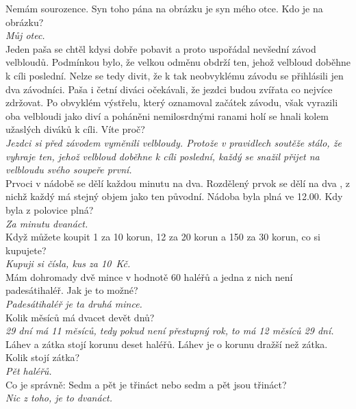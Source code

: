 \begin{multicols}{2}
\noindent
Nemám sourozence. Syn toho pána na obrázku je syn mého otce.
Kdo je na obrázku?\\[1 mm]
{\sl Můj otec.}\\

\noindent
Jeden paša se chtěl kdysi dobře pobavit a proto uspořádal 
nevšední závod velbloudů. Podmínkou bylo, že velkou odměnu obdrží 
ten, jehož velbloud doběhne k cíli poslední. Nelze se tedy divit, 
že k tak neobvyklému závodu se přihlásili jen dva závodníci. 
Paša i četní diváci očekávali, že jezdci budou zvířata co nejvíce 
zdržovat. Po obvyklém výstřelu, který oznamoval začátek závodu, však
vyrazili oba velbloudi jako diví a poháněni nemilosrdnými ranami holí 
se hnali kolem užaslých diváků k cíli. Víte proč?\\[1 mm]
{\sl Jezdci si před závodem vyměnili velbloudy. Protože v pravidlech
soutěže stálo, že vyhraje ten, jehož velbloud doběhne k cíli
poslední, každý se snažil přijet na velbloudu svého soupeře první.}\\

\noindent
Prvoci v nádobě se dělí každou minutu na dva. Rozdělený
prvok se dělí na dva , z nichž každý má stejný objem jako ten
původní. Nádoba byla plná ve 12.00. Kdy byla z polovice plná?\\[1 mm]
{\sl Za minutu dvanáct.}\\

\noindent
Když můžete koupit 1 za 10 korun, 12 za 20 korun a 150 za
30 korun, co si kupujete?\\[1 mm]
{\sl Kupuji si čísla, kus za 10~Kč.}\\

\noindent
Mám dohromady dvě mince v hodnotě 60 haléřů a jedna z nich 
není padesátihaléř. Jak je to možné?\\[1 mm]
{\sl Padesátihaléř je ta druhá mince.}\\

\noindent
Kolik měsíců má dvacet devět dnů?\\[1 mm]
{\sl 29 dní má 11 měsíců, tedy pokud není přestupný rok, to má
12 měsíců 29 dní.}\\

\noindent
Láhev a zátka stojí korunu deset haléřů. Láhev je o korunu 
dražší než zátka. Kolik stojí zátka?\\[1 mm]
{\sl Pět haléřů.}\\

\noindent
Co je správně: Sedm a pět je třináct nebo sedm a pět jsou 
třináct?\\[1 mm]
{\sl Nic z toho, je to dvanáct.}\\


\end{multicols}
